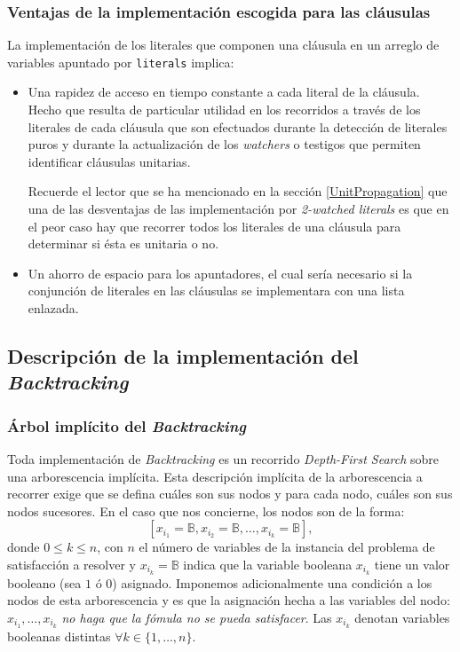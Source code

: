 \documentclass[12pt,lettersize]{article}
\begin{document}
\subsubsection{Ventajas de la implementación escogida para las cláusulas}
La implementación de los literales que componen una cláusula en un arreglo de
variables apuntado por {\tt literals} implica: \vspace{-2.5mm}
\begin{itemize}
\item Una rapidez de acceso en tiempo constante a cada literal de la
  cláusula. Hecho que resulta de particular utilidad en los recorridos a través
  de los literales de cada cláusula que son efectuados durante la detección de
  literales puros y durante la actualización de los \emph{watchers} o testigos
  que permiten identificar cláusulas unitarias. 

  Recuerde el lector que se ha mencionado en la sección \ref{UnitPropagation} que
  una de las desventajas de las implementación por \emph{2-watched literals} es
  que en el peor caso hay que recorrer todos los literales de una cláusula para
  determinar si ésta es unitaria o no.

\item Un ahorro de espacio para los apuntadores, el cual sería necesario si la
  conjunción de literales en las cláusulas se implementara con una lista
  enlazada.
\end{itemize}

\subsection{Descripción de la implementación del \emph{Backtracking}}
\subsubsection{\'Arbol implícito del \emph{Backtracking}}\label{backtracking}
Toda implementación de \emph{Backtracking} es un recorrido \emph{Depth-First
  Search} sobre una arborescencia implícita. Esta descripción implícita de la
arborescencia a recorrer exige que se defina cuáles son sus nodos y para cada
nodo, cuáles son sus nodos sucesores. En el caso que nos concierne, los nodos
son de la forma:
\[[x_{i_1}=\mathbb{B},x_{i_2}=\mathbb{B},\ldots, x_{i_k} = \mathbb{B} ], \]
donde $0\leq k \leq n$, con $n$ el número de variables de la instancia del
problema de satisfacción a resolver y $x_{i_k}=\mathbb{B}$ indica que la
variable booleana $x_{i_k}$ tiene un valor booleano (sea $1$ ó $0$)
asignado. Imponemos adicionalmente una condición a los nodos de esta
arborescencia y es que la asignación hecha a las variables del nodo:
$x_{i_1},\ldots,x_{i_k}$ \emph{no haga que la fómula no se pueda
  satisfacer}. Las $x_{i_k}$ denotan variables booleanas distintas $\forall k
\in \{1,\ldots,n\}$.
\end{document}
